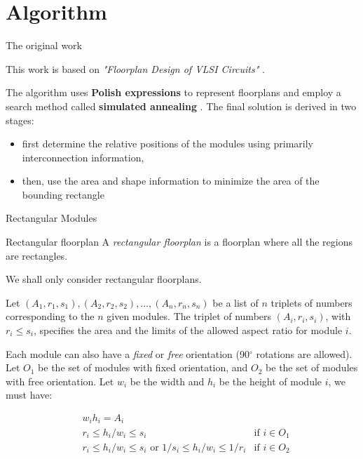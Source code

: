 \documentclass[xcolor=pdftex,dvipsnames,table]{beamer}
\begin{document}
\section{Algorithm}

\begin{frame}{The original work}
  \begin{block}{}
    This work is based on \textit{"Floorplan Design of VLSI Circuits"} \cite{Wong1989}.
  \end{block}
  \begin{block}{}
    The algorithm uses \textbf{Polish expressions} to represent floorplans and employ a search method
    called \textbf{simulated annealing} \cite{Ki1983}. The final solution is derived in two stages:
    \begin{itemize}
      \pause
      \item first determine the relative positions of the modules using primarily interconnection information,
      \pause
      \item then, use the area and shape information to minimize the area of the bounding rectangle
    \end{itemize}
  \end{block}
\end{frame}

\begin{frame}[allowframebreaks]{Rectangular Modules}
  \begin{block}{Rectangular floorplan}
    A \textit{rectangular floorplan} is a floorplan where all the regions are rectangles.
  \end{block}

  We shall only consider rectangular floorplans.

  \begin{block}{}
    Let $(A_1, r_1, s_1),(A_2, r_2, s_2),\ldots,(A_n, r_n, s_n)$ be a list of $n$ triplets of numbers corresponding to the $n$ given modules. The triplet of numbers $(A_i, r_i, s_i)$, with $r_i \leq s_i$, specifies the area and the limits of the allowed aspect ratio for module $i$.
  \end{block}

  \begin{block}{}
    Each module can also have a \textit{fixed} or \textit{free} orientation (90$^\circ$ rotations are allowed). Let $O_1$ be the set of modules with fixed orientation, and $O_2$ be the set of modules with free orientation. Let $w_i$ be the width and $h_i$ be the height of module $i$, we must have:

    \begin{align}
      &w_ih_i = A_i\\
      &r_i \leq h_i/w_i \leq s_i &\text{if } i \in O_1\\
      &r_i \leq h_i/w_i \leq s_i \text{ or } 1/s_i \leq h_i/w_i \leq 1/r_i &\text{if } i \in O_2
    \end{align}
  \end{block}
\end{frame}
\end{document}
